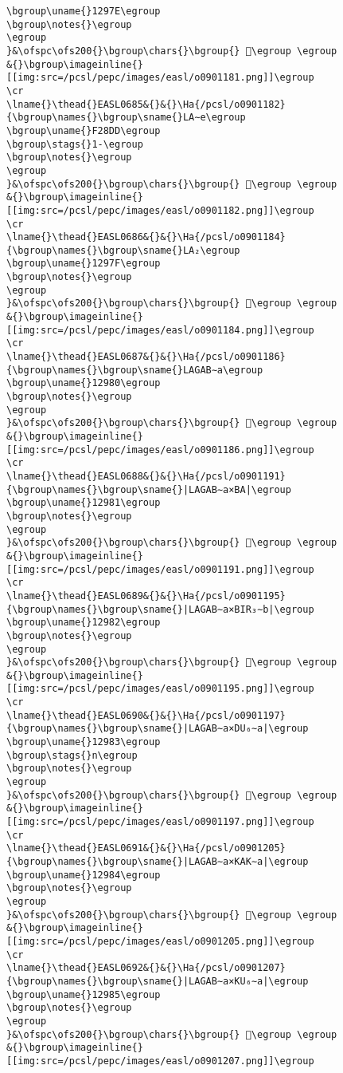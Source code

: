 \begin{verbatim}
\bgroup\uname{}1297E\egroup
\bgroup\notes{}\egroup
\egroup
}&\ofspc\ofs200{}\bgroup\chars{}\bgroup{} 𒥾\egroup \egroup
&{}\bgroup\imageinline{}[[img:src=/pcsl/pepc/images/easl/o0901181.png]]\egroup
\cr
\lname{}\thead{}EASL0685&{}&{}\Ha{/pcsl/o0901182}{\bgroup\names{}\bgroup\sname{}LA∼e\egroup
\bgroup\uname{}F28DD\egroup
\bgroup\stags{}1-\egroup
\bgroup\notes{}\egroup
\egroup
}&\ofspc\ofs200{}\bgroup\chars{}\bgroup{} 󲣝\egroup \egroup
&{}\bgroup\imageinline{}[[img:src=/pcsl/pepc/images/easl/o0901182.png]]\egroup
\cr
\lname{}\thead{}EASL0686&{}&{}\Ha{/pcsl/o0901184}{\bgroup\names{}\bgroup\sname{}LA₂\egroup
\bgroup\uname{}1297F\egroup
\bgroup\notes{}\egroup
\egroup
}&\ofspc\ofs200{}\bgroup\chars{}\bgroup{} 𒥿\egroup \egroup
&{}\bgroup\imageinline{}[[img:src=/pcsl/pepc/images/easl/o0901184.png]]\egroup
\cr
\lname{}\thead{}EASL0687&{}&{}\Ha{/pcsl/o0901186}{\bgroup\names{}\bgroup\sname{}LAGAB∼a\egroup
\bgroup\uname{}12980\egroup
\bgroup\notes{}\egroup
\egroup
}&\ofspc\ofs200{}\bgroup\chars{}\bgroup{} 𒦀\egroup \egroup
&{}\bgroup\imageinline{}[[img:src=/pcsl/pepc/images/easl/o0901186.png]]\egroup
\cr
\lname{}\thead{}EASL0688&{}&{}\Ha{/pcsl/o0901191}{\bgroup\names{}\bgroup\sname{}|LAGAB∼a×BA|\egroup
\bgroup\uname{}12981\egroup
\bgroup\notes{}\egroup
\egroup
}&\ofspc\ofs200{}\bgroup\chars{}\bgroup{} 𒦁\egroup \egroup
&{}\bgroup\imageinline{}[[img:src=/pcsl/pepc/images/easl/o0901191.png]]\egroup
\cr
\lname{}\thead{}EASL0689&{}&{}\Ha{/pcsl/o0901195}{\bgroup\names{}\bgroup\sname{}|LAGAB∼a×BIR₃∼b|\egroup
\bgroup\uname{}12982\egroup
\bgroup\notes{}\egroup
\egroup
}&\ofspc\ofs200{}\bgroup\chars{}\bgroup{} 𒦂\egroup \egroup
&{}\bgroup\imageinline{}[[img:src=/pcsl/pepc/images/easl/o0901195.png]]\egroup
\cr
\lname{}\thead{}EASL0690&{}&{}\Ha{/pcsl/o0901197}{\bgroup\names{}\bgroup\sname{}|LAGAB∼a×DU₆∼a|\egroup
\bgroup\uname{}12983\egroup
\bgroup\stags{}n\egroup
\bgroup\notes{}\egroup
\egroup
}&\ofspc\ofs200{}\bgroup\chars{}\bgroup{} 𒦃\egroup \egroup
&{}\bgroup\imageinline{}[[img:src=/pcsl/pepc/images/easl/o0901197.png]]\egroup
\cr
\lname{}\thead{}EASL0691&{}&{}\Ha{/pcsl/o0901205}{\bgroup\names{}\bgroup\sname{}|LAGAB∼a×KAK∼a|\egroup
\bgroup\uname{}12984\egroup
\bgroup\notes{}\egroup
\egroup
}&\ofspc\ofs200{}\bgroup\chars{}\bgroup{} 𒦄\egroup \egroup
&{}\bgroup\imageinline{}[[img:src=/pcsl/pepc/images/easl/o0901205.png]]\egroup
\cr
\lname{}\thead{}EASL0692&{}&{}\Ha{/pcsl/o0901207}{\bgroup\names{}\bgroup\sname{}|LAGAB∼a×KU₆∼a|\egroup
\bgroup\uname{}12985\egroup
\bgroup\notes{}\egroup
\egroup
}&\ofspc\ofs200{}\bgroup\chars{}\bgroup{} 𒦅\egroup \egroup
&{}\bgroup\imageinline{}[[img:src=/pcsl/pepc/images/easl/o0901207.png]]\egroup

\end{verbatim}
